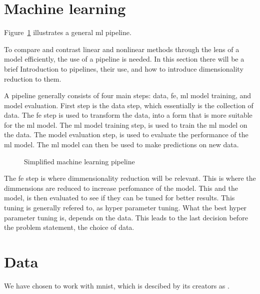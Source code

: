 \section{Machine learning}\label{sec:machine-learning}

Figure~\ref{fig:basic-machine-learning-pipeline} illustrates a general \gls{ml} pipeline.

To compare and contrast linear and nonlinear methods through the lens of a model efficiently, the use of a pipeline is needed. In this section there will be a brief Introduction to pipelines, their use, and how to introduce dimensionality reduction to them.

A pipeline generally consists of four main steps: data, \gls{fe}, \gls{ml} model training, and model evaluation. First step is the data step, which essentially is the collection of data. The \gls{fe} step is used to transform the data, into a form that is more suitable for the \gls{ml} model. The \gls{ml} model training step, is used to train the \gls{ml} model on the data. The model evaluation step, is used to evaluate the performance of the \gls{ml} model. The \gls{ml} model can then be used to make predictions on new data. 

\begin{figure}[htb!]
    \centering
    
    \caption{Simplified machine learning pipeline}
    \label{fig:basic-machine-learning-pipeline}
\end{figure}

The \gls{fe} step is where dimmensionality reduction will be relevant. This is where the dimmensions are reduced to increase perfomance of the model. This and the model, is then evaluated to see if they can be tuned for better results. This tuning is generally refered to, as hyper parameter tuning. What the best hyper parameter tuning is, depends on the data. This leads to the last decision before the problem statement, the choice of data.

\section{Data}\label{sec:data}
We have chosen to work with \gls{mnist}, which is descibed by its creators as
.


